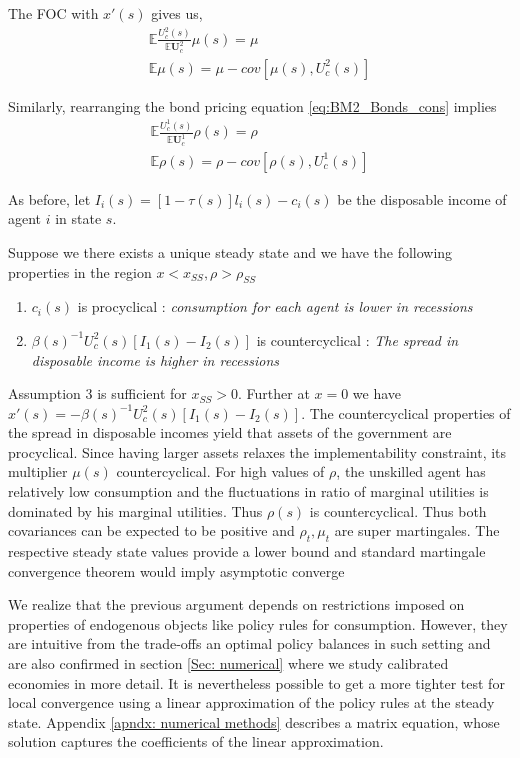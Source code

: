 \documentclass[thmsb,11pt]{article}
\begin{document}
The FOC with $x'(s)$ gives us, 
\begin{align}
\mathbb{E} \frac{U^2_c(s)}{\mathbb{E}\bm{U}^2_c}\mu(s)=\mu\\
\mathbb{E} \mu(s)=\mu-cov\left[\mu(s),U^2_c(s)\right]
 \end{align}

 Similarly, rearranging the bond pricing equation \eqref{eq:BM2_Bonds_cons} implies
\begin{align}
\mathbb{E} \frac{U^1_c(s)}{\mathbb{E}\bm{U}^1_c}\rho(s)=\rho\\
\mathbb{E} \rho(s)=\rho-cov\left[\rho(s),U^1_c(s)\right]
 \end{align}



As before, let  $I_i(s)=[1-\tau(s)]l_i(s)-c_i(s)$ be the disposable income of agent $i$ in state $s$. 

Suppose we there exists a unique steady state and we have the following properties in the region $x<x_{SS}, \rho>\rho_{SS}$ 

\begin{enumerate}
 \item $c_i(s)$ is procyclical : \emph{consumption for each agent is lower in recessions}
 \item $\beta(s)^{-1}U^2_c(s)\left[I_1(s)-I_2(s)\right]$ is countercyclical : \emph{The spread in disposable income is higher in recessions}
 \end{enumerate}



Assumption 3  is sufficient for $x_{SS}>0$. Further at $x=0$ we have $x'(s)=-\beta(s)^{-1}U^2_c(s)\left[I_1(s)-I_2(s)\right]$. The countercyclical properties of the spread in disposable incomes yield that assets of the government are procyclical. Since having larger assets relaxes the implementability constraint, its multiplier $\mu(s)$ countercyclical. For high values of $\rho$, the unskilled agent has relatively low consumption and the fluctuations in ratio of marginal utilities is dominated by his marginal utilities. Thus $\rho(s)$ is countercyclical. Thus both covariances can be expected to be positive and $\rho_t,\mu_t$ are super martingales. The respective steady state values provide a lower bound and standard martingale convergence theorem would imply asymptotic converge

We realize that the previous argument depends on restrictions imposed on properties of endogenous objects like policy rules for consumption. However, they are intuitive from the trade-offs an optimal policy balances in such setting and are also confirmed in section \ref{Sec: numerical} where we study calibrated economies in more detail. It is nevertheless possible to get a more tighter test for local convergence using a linear approximation of the policy rules at the steady state. Appendix \ref{apndx: numerical methods} describes a matrix equation, whose solution captures the coefficients of the linear approximation.
\end{document}
